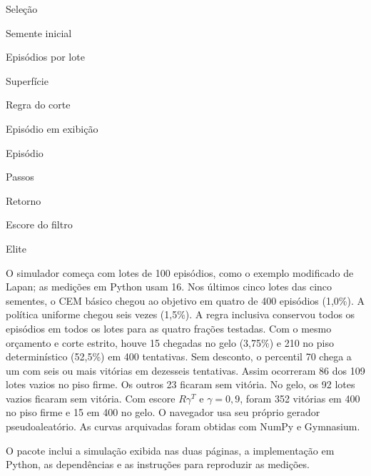 Seleção

Semente inicial

Episódios por lote

Superfície

Regra do corte

Episódio em exibição

Episódio

Passos

Retorno

Escore do filtro

Elite

O simulador começa com lotes de 100 episódios, como o exemplo modificado de Lapan; as medições em Python usam 16. Nos últimos cinco lotes das cinco sementes, o CEM básico chegou ao objetivo em quatro de 400 episódios (1,0\%). A política uniforme chegou seis vezes (1,5\%). A regra inclusiva conservou todos os episódios em todos os lotes para as quatro frações testadas. Com o mesmo orçamento e corte estrito, houve 15 chegadas no gelo (3,75\%) e 210 no piso determinístico (52,5\%) em 400 tentativas. Sem desconto, o percentil 70 chega a um com seis ou mais vitórias em dezesseis tentativas. Assim ocorreram 86 dos 109 lotes vazios no piso firme. Os outros 23 ficaram sem vitória. No gelo, os 92 lotes vazios ficaram sem vitória. Com escore $R\gamma^T$ e $\gamma=0{,}9$, foram 352 vitórias em 400 no piso firme e 15 em 400 no gelo. O navegador usa seu próprio gerador pseudoaleatório. As curvas arquivadas foram obtidas com NumPy e Gymnasium.

O pacote inclui a simulação exibida nas duas páginas, a implementação em Python, as dependências e as instruções para reproduzir as medições.
